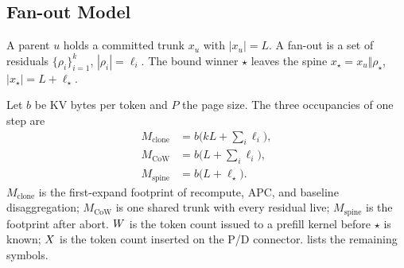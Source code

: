\subsection{Fan-out Model}
\label{sec:model}

\begin{definition}
\label{def:step}
A parent $u$ holds a committed trunk $x_u$ with $|x_u|{=}L$.
A fan-out is a set of residuals $\{\rho_i\}_{i=1}^{k}$, $|\rho_i|{=}\ell_i$.
The bound winner $\star$ leaves the spine $x_\star=x_u\Vert\rho_\star$, $|x_\star|{=}L{+}\ell_\star$.
\end{definition}

Let $b$ be KV bytes per token and $P$ the page size.
The three occupancies of one step are
\begin{align}
M_{\mathrm{clone}} &= b\bigl(kL+\textstyle\sum_i\ell_i\bigr), \label{eq:mem}\\
M_{\mathrm{CoW}} &= b\bigl(L+\textstyle\sum_i\ell_i\bigr), \nonumber\\
M_{\mathrm{spine}} &= b\bigl(L+\ell_\star\bigr). \nonumber
\end{align}
$M_{\mathrm{clone}}$ is the first-expand footprint of recompute, APC, and baseline disaggregation;
$M_{\mathrm{CoW}}$ is one shared trunk with every residual live;
$M_{\mathrm{spine}}$ is the footprint after abort.
$W$ is the token count issued to a prefill kernel before $\star$ is known;
$X$ is the token count inserted on the P/D connector.
 lists the remaining symbols.

